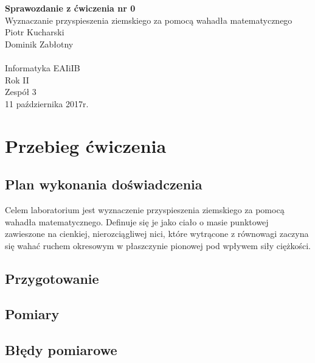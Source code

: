 \documentclass[a4paper,12pts]{article}
\begin{document}
	\begin{flushleft}
		\begin{vplace}[0.7]
			{\large \textbf{Sprawozdanie z ćwiczenia nr 0} }
			\\ Wyznaczanie przyspieszenia ziemskiego za pomocą wahadła matematycznego
			\\ Piotr Kucharski \\ Dominik Zabłotny \\ \\ Informatyka EAIiIB \\ Rok II \\ Zespół 3
			\\ 11 października 2017r.	
		\end{vplace}
		
	\end{flushleft}
	
	\newpage
	
	
	\section{Przebieg ćwiczenia}
	\subsection{Plan wykonania doświadczenia}
	Celem laboratorium jest wyznaczenie przyspieszenia ziemskiego za pomocą wahadła matematycznego. Definuje się je jako ciało o masie punktowej zawieszone na cienkiej, nierozciągliwej nici, które wytrącone z równowagi zaczyna się wahać ruchem okresowym w płaszczynie pionowej pod wpływem siły ciężkości.
	
	\subsection{Przygotowanie}
	
	\subsection{Pomiary}
	
	\subsection{Błędy pomiarowe}
	
\end{document}
